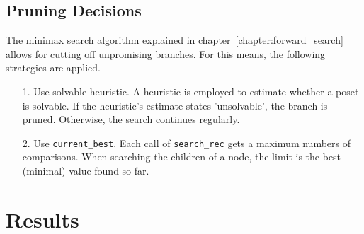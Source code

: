 \documentclass[10pt,journal,compsoc]{IEEEtran}
\begin{document}


\subsection{Pruning Decisions}
The minimax search algorithm explained in chapter~\ref{chapter:forward_search} allows for cutting off unpromising branches. For this means, the following strategies are applied.

\begin{enumerate}
  \item[1.]
    Use solvable-heuristic. A heuristic is employed to estimate whether a poset is solvable. If the heuristic's estimate states 'unsolvable', the branch is pruned.
    Otherwise, the search continues regularly.
  \item[2.]
    Use \texttt{current\_best}. Each call of \texttt{search\_rec} gets a maximum numbers of comparisons.
    When searching the children of a node, the limit is the best (minimal) value found so far.
\end{enumerate}

\section{Results}
\end{document}

